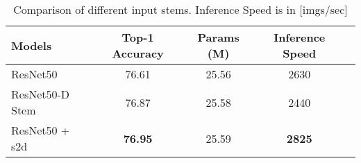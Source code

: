\begin{table}[h!]
    \begin{center}
        \small
        \begin{tabular}{|l|c|c|c|c|}
            \hline
            Models & Top-1 Accuracy & Params (M) & Inference Speed \\ \hline
            ResNet50         & 76.61 & 25.56 & 2630 \\ 
            ResNet50-D Stem  & 76.87 & 25.58 & 2440 \\ 
            ResNet50 + s2d   & \textbf{76.95} & 25.59 & \textbf{2825} \\ \hline
        \end{tabular}
    \end{center} 
    \caption{Comparison of different input stems. Inference Speed is in [imgs/sec] }
    \label{table:stem_comparison}
\end{table}